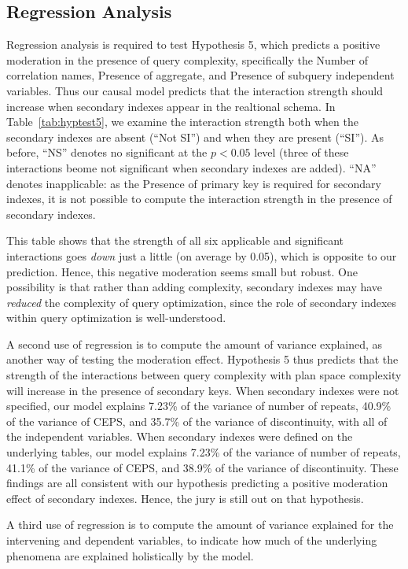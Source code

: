 \documentclass[prodmode,acmtods]{acmsmall}
\begin{document}
\subsection{Regression Analysis}\label{sec:regression}
Regression analysis is required to test Hypothesis 5, which predicts a positive
moderation in the presence of query complexity, specifically the Number of
correlation names, Presence of aggregate, and Presence of subquery
independent variables. Thus our causal model predicts that the interaction
strength should increase when secondary indexes appear in the realtional schema.
In Table~\ref{tab:hyptest5}, we examine the interaction strength both when
the secondary indexes are absent (``Not SI'') and when they are present
(``SI''). As before, ``NS'' denotes no significant at the $p < 0.05$ level (three
of these interactions beome not significant when secondary indexes are
added). ``NA'' denotes inapplicable: as the Presence of primary key is
required for secondary indexes, it is not possible to compute the
interaction strength in the presence of secondary indexes.

This table shows that the strength of all six applicable and significant
interactions goes {\em down} just a little (on average by 0.05), which is
opposite to our prediction. Hence, this negative moderation seems small but
robust. One possibility is that rather than adding
complexity, secondary indexes may have {\em reduced} the complexity of query
optimization, since the role of secondary indexes within query optimization
is well-understood.

A second use of regression is to compute the amount of variance explained,
as another way of testing the moderation effect.
Hypothesis 5 thus predicts that the strength of the interactions between
query complexity with plan space complexity will increase in the
presence of secondary keys. When
secondary indexes were not specified, our model explains 
7.23\% of the variance of number of repeats, 40.9\% of the variance of CEPS, and 35.7\% of the variance
of discontinuity, with all of the independent variables. When
secondary indexes were defined on the underlying tables, our model explains
7.23\% of the variance of number of repeats, 41.1\% of the variance of CEPS, and
38.9\% of the variance of discontinuity. These findings are all consistent with our
hypothesis predicting a positive moderation effect of secondary
indexes. Hence, the jury is still out on that hypothesis.

A third use of regression is to compute the amount of variance explained
for the intervening and dependent variables, to indicate how much of the
underlying phenomena are explained holistically by the model.
\end{document}
